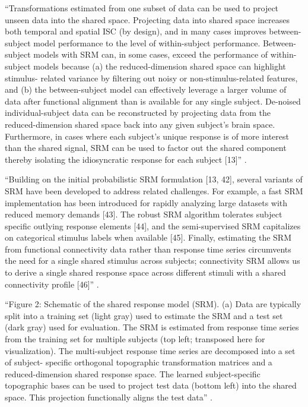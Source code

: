 ``Transformations estimated from one subset of data can be used to project
unseen data into the shared space. Projecting data into shared space increases
both temporal and spatial ISC (by design), and in many cases improves
between-subject model performance to the level of within-subject performance.
Between-subject models with SRM can, in some cases, exceed the performance of
within-subject models because (a) the reduced-dimension shared space can
highlight stimulus- related variance by filtering out noisy or
non-stimulus-related features, and (b) the between-subject model can effectively
leverage a larger volume of data after functional alignment than is available
for any single subject. De-noised individual-subject data can be reconstructed
by projecting data from the reduced-dimension shared space back into any given
subject’s brain space.  Furthermore, in cases where each subject’s unique
response is of more interest than the shared signal, SRM can be used to factor
out the shared component thereby isolating the idiosyncratic response for each
subject [13]'' \citep{kumar2020brainiak}.

``Building on the initial probabilistic SRM formulation [13, 42], several
variants of SRM have been developed to address related challenges. For example,
a fast SRM implementation has been introduced for rapidly analyzing large
datasets with reduced memory demands [43]. The robust SRM algorithm tolerates
subject specific outlying response elements [44], and the semi-supervised SRM
capitalizes on categorical stimulus labels when available [45]. Finally,
estimating the SRM from functional connectivity data rather than response time
series circumvents the need for a single shared stimulus across subjects;
connectivity SRM allows us to derive a single shared response space across
different stimuli with a shared connectivity profile [46]''
\citep{kumar2020brainiak}.

``Figure 2: Schematic of the shared response model (SRM). (a) Data are typically
split into a training set (light gray) used to estimate the SRM and a test set
(dark gray) used for evaluation. The SRM is estimated from response time series
from the training set for multiple subjects (top left; transposed here for
visualization). The multi-subject response time series are decomposed into a set
of subject- specific orthogonal topographic transformation matrices and a
reduced-dimension shared response space. The learned subject-specific
topographic bases can be used to project test data (bottom left) into the shared
space. This projection functionally aligns the test data''
\citep{kumar2020brainiak}.

